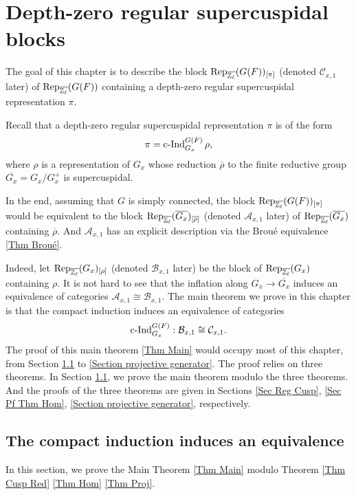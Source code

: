 
	\chapter{Depth-zero regular supercuspidal blocks} \label{Chapter Rep}
	
	The goal of this chapter is to describe the block $\operatorname{\operatorname{Rep}}_{\overline{\mathbb{Z}_{\ell}}}(G(F))_{[\pi]}$ (denoted $\mathcal{C}_{x,1}$ later) of $\operatorname{\operatorname{Rep}}_{\overline{\mathbb{Z}_{\ell}}}(G(F))$ containing a  depth-zero regular supercuspidal representation $\pi$.
	
	Recall that a depth-zero regular supercuspidal representation $\pi$ is of the form
	$$\pi=\operatorname{\operatorname{c-Ind}}_{G_x}^{G(F)}\rho,$$
	where $\rho$ is a representation of $G_x$ whose reduction $\overline{\rho}$ to the finite reductive group
	$\overline{G_x}=G_x/G_x^+$ is supercuspidal.
	
	In the end, assuming that $G$ is simply connected, the block $\operatorname{\operatorname{Rep}}_{\overline{\mathbb{Z}_{\ell}}}(G(F))_{[\pi]}$ would be equivalent to the block $\operatorname{\operatorname{Rep}}_{\overline{\mathbb{Z}_{\ell}}}(\overline{G_x})_{[\overline{\rho}]}$ (denoted $\mathcal{A}_{x,1}$ later) of $\operatorname{\operatorname{Rep}}_{\overline{\mathbb{Z}_{\ell}}}(\overline{G_x})$ containing $\overline{\rho}$. And $\mathcal{A}_{x,1}$ has an explicit description via the Broué equivalence \ref{Thm Broué}.
	
	Indeed, let $\operatorname{\operatorname{Rep}}_{\overline{\mathbb{Z}_{\ell}}}(G_x)_{[\rho]}$ (denoted $\mathcal{B}_{x,1}$ later) be the block of $\operatorname{\operatorname{Rep}}_{\overline{\mathbb{Z}_{\ell}}}(G_x)$ containing $\rho$. It is not hard to see that the inflation along $G_x \to \overline{G_x}$ induces an equivalence of categories 
	$\mathcal{A}_{x,1} \cong \mathcal{B}_{x,1}$. The main theorem we prove in this chapter is that the compact induction induces an equivalence of categories
	$$\operatorname{\operatorname{c-Ind}}_{G_x}^{G(F)}: \mathcal{B}_{x,1} \cong \mathcal{C}_{x,1}.$$
	The proof of this main theorem \ref{Thm Main} would occupy most of this chapter, from Section \ref{Section cInd} to \ref{Section projective generator}. The proof relies on three theorems. In Section \ref{Section cInd}, we prove the main theorem modulo the three theorems. And the proofs of the three theorems are given in Sections \ref{Sec Reg Cusp}, \ref{Sec Pf Thm Hom}, \ref{Section projective generator}, respectively.
	
	
	\section{The compact induction induces an equivalence}\label{Section cInd}
	In this section, we prove the Main Theorem \ref{Thm Main} modulo Theorem \ref{Thm Cusp Red} \ref{Thm Hom} \ref{Thm Proj}.
	
